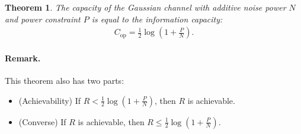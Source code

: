 \documentclass{article}
\numberwithin{equation}{section}
\theoremstyle{plain}
\newtheorem{theorem}{Theorem}[section]
\theoremstyle{definition}
\begin{document}
\begin{theorem}\label{scctgauss}
The capacity of the Gaussian channel with additive noise power $N$ and power
constraint $P$ is equal to the information capacity:
\begin{align*}
	C_\mathrm{op}=\frac{1}{2}\log\left(1+\frac{P}{N}\right).
\end{align*}
\end{theorem}
\paragraph{Remark.} This theorem also has two parts:
\begin{itemize}
	\item (Achievability) If $R<\frac{1}{2}\log\left(1+\frac{P}{N}\right)$, then $R$ is achievable.
	\item (Converse) If $R$ is achievable, then $R\leq \frac{1}{2}\log\left(1+\frac{P}{N}\right)$.
\end{itemize}
\end{document}

